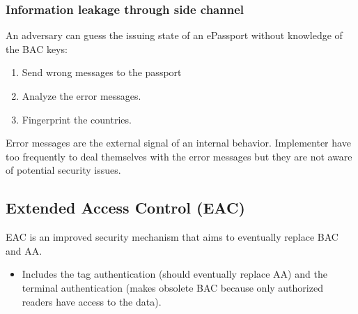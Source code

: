 \subsubsection{Information leakage through side channel}
An adversary can guess the issuing state of an ePassport without
knowledge of the BAC keys:
\begin{enumerate}
    \item Send wrong messages to the passport
    \item Analyze the error messages.
    \item  Fingerprint the countries.
\end{enumerate}
Error messages are the external signal of an internal behavior.
Implementer have too frequently to deal themselves with the
error messages but they are not aware of potential security issues.

\subsection{Extended Access Control (EAC)}
EAC is an improved security mechanism that aims to eventually
replace BAC and AA.

\begin{itemize}
    \item Includes the tag authentication (should eventually replace AA)
        and the terminal authentication (makes obsolete BAC because
        only authorized readers have access to the data).
\end{itemize}

